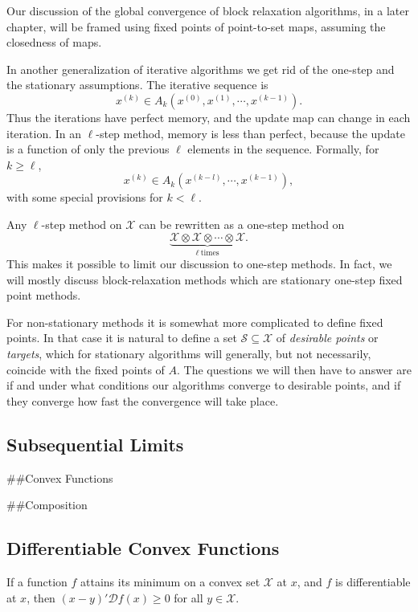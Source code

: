 \documentclass[
  12pt,
]{book}
\begin{document}
Our discussion of the global convergence of block relaxation algorithms, in a later chapter, will be framed using fixed points of point-to-set maps, assuming the closedness of maps.

In another generalization of iterative algorithms we get rid of the one-step and the stationary assumptions. The iterative sequence is
\[
x^{(k)}\in A_k(x^{(0)},x^{(1)},\cdots,x^{(k-1)}).
\]
Thus the iterations have perfect memory, and the update map can change in each iteration. In
an \(\ell\)-step method, memory is less than perfect, because the update is a function of only the previous \(\ell\) elements in the sequence. Formally, for \(k\geq\ell\),
\[
x^{(k)}\in A_k(x^{(k-l)},\cdots,x^{(k-1)}),
\]
with some special provisions for \(k<\ell\).

Any \(\ell\)-step method on \(\mathcal{X}\) can be rewritten as a one-step method on
\[
\underbrace{\mathcal{X}\otimes\mathcal{X}\otimes\cdots\otimes\mathcal{X}}_{\ell\ \text{times}}.
\]
This makes it possible to limit our discussion to one-step methods. In fact, we will mostly discuss block-relaxation methods which are stationary one-step fixed point methods.

For non-stationary methods it is somewhat more complicated to define fixed points. In that case it is natural to define a set \(\mathcal{S}\subseteq\mathcal{X}\) of \emph{desirable points} or \emph{targets}, which for stationary algorithms will generally, but not necessarily, coincide with the fixed points of \(A\).
The questions we will then have to answer are if and under what conditions our algorithms converge to desirable points, and if they converge how fast the convergence will take place.

\hypertarget{subsequential-limits}{%
\subsection{Subsequential Limits}\label{subsequential-limits}}

\#\#Convex Functions

\#\#Composition

\hypertarget{differentiable-convex-functions}{%
\subsection{Differentiable Convex Functions}\label{differentiable-convex-functions}}

If a function \(f\) attains its minimum on
a convex set \(\mathcal{X}\) at \(x\), and \(f\) is differentiable at \(x\), then \((x-y)'\mathcal{D}f(x)\geq 0\) for all \(y\in\mathcal{X}\).
\end{document}
